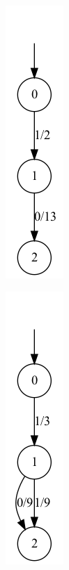 \begin{figure}[h]
\begin{subfigure}{.15\textwidth}
        \caption{}
        \label{proj_img3}
    \end{subfigure}
    \hfil
    \begin{subfigure}{.15\textwidth}
        \centering
        \includegraphics[scale=0.3]{obrazky-figures/proj_img1.png}
        \caption{}
        \label{proj_img1}
    \end{subfigure}
    \hfil
    \begin{subfigure}{.15\textwidth}
        \centering
        \includegraphics[scale=0.3]{obrazky-figures/proj_img5.png}
        \caption{}
        \label{proj_img5}
    \end{subfigure}
    \hfil
    \begin{subfigure}{.15\textwidth}

\end{subfigure}
\end{figure}

